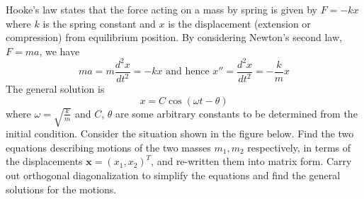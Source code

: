 \begin{Exercise}
Hooke's law states that the force acting on a mass by spring is given by $F = -kx$ where $k$ is the spring constant and $x$ is the displacement (extension or compression) from equilibrium position. By considering Newton's second law, $F = ma$, we have
\begin{equation*}
ma = m\frac{d^2x}{dt^2} = -kx\text{ and hence }x'' = \frac{d^2x}{dt^2} = -\frac{k}{m}x
\end{equation*}
The general solution is
\begin{equation*}
x = C\cos(\omega t - \theta)
\end{equation*}
where $\omega = \sqrt{\frac{k}{m}}$ and $C$, $\theta$ are some arbitrary constants to be determined from the initial condition. Consider the situation  shown in the figure below. Find the two equations describing motions of the two masses $m_1, m_2$ respectively, in terms of the displacements $\textbf{x} = (x_1, x_2)^T$, and re-written them into matrix form. Carry out orthogonal diagonalization to simplify the equations and find the general solutions for the motions.
\begin{center}
\end{center}
\end{Exercise}